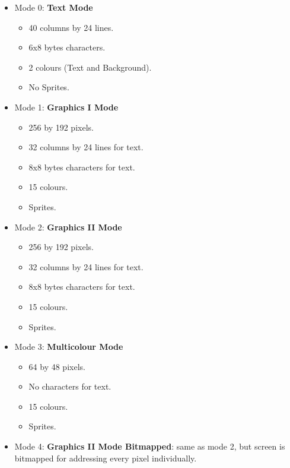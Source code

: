     \begin{itemize}
        \item Mode 0: \textbf{Text Mode}
        \begin{itemize}
            \item 40 columns by 24 lines.
            \item 6x8 bytes characters.
            \item 2 colours (Text and Background).
            \item No Sprites.
        \end{itemize}
        \item Mode 1: \textbf{Graphics I Mode}
        \begin{itemize}
            \item 256 by 192 pixels.
            \item 32 columns by 24 lines for text.
            \item 8x8 bytes characters for text.
            \item 15 colours.
            \item Sprites.
        \end{itemize}
        \item Mode 2: \textbf{Graphics II Mode}
        \begin{itemize}
            \item 256 by 192 pixels.
            \item 32 columns by 24 lines for text.
            \item 8x8 bytes characters for text.
            \item 15 colours.
            \item Sprites.
        \end{itemize}
        \item Mode 3: \textbf{Multicolour Mode}
        \begin{itemize}
            \item 64 by 48 pixels.
            \item No characters for text.
            \item 15 colours.
            \item Sprites.
        \end{itemize}
        \item Mode 4: \textbf{Graphics II Mode Bitmapped}: same as mode 2, but
        screen is bitmapped for addressing every pixel individually.
    \end{itemize}

